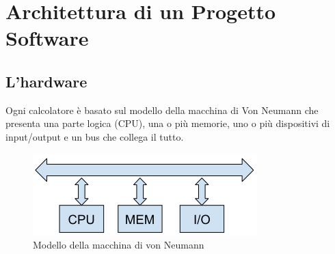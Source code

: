 \section{Architettura di un Progetto Software}

\subsection{L'hardware}

Ogni calcolatore è basato sul modello della macchina di Von Neumann che presenta una parte logica (CPU), una o più memorie, uno o più dispositivi di input/output e un bus che collega il tutto. 

\begin{center}
\begin{figure}[H]
\centering
\includegraphics[scale=1]{figures/vonmn.png}
\caption{Modello della macchina di von Neumann} 
\end{figure}
\end{center}

